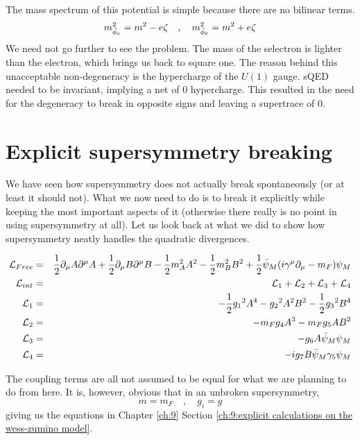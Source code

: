 The mass spectrum of this potential is simple because there are no bilinear terms.
\begin{equation}
    m^2_{\Tilde{\phi}_{e}} = m^2 - e\zeta \quad , \quad m^2_{\Tilde{\phi}_{\Bar{e}}} = m^2 + e\zeta
\end{equation}
We need not go further to see the problem. The mass of the selectron is lighter than the electron, which brings us back to square one. The reason behind this unacceptable non-degeneracy is the hypercharge of the $U(1)$ gauge. sQED needed to be invariant, implying a net of 0 hypercharge. This resulted in the need for the degeneracy to break in opposite signs and leaving a supertrace of 0.

\section{Explicit supersymmetry breaking}
\label{ch:14:explicity susy breaking}
We have seen how supersymmetry does not actually break spontaneously (or at least it should not). What we now need to do is to break it explicitly while keeping the most important aspects of it (otherwise there really is no point in using supersymmetry at all). Let us look back at what we did to show how supersymmetry neatly handles the quadratic divergences.

\begin{eqnarray}
    \mathcal{L}_{Free} &=& \frac{1}{2}\partial_\mu A \partial^\mu A + \frac{1}{2} \partial_\mu B \partial^\mu B - \frac{1}{2} m_A^2 A^2 - \frac{1}{2} m_B^2 B^2 + \frac{1}{2} \Bar{\psi}_M (i\gamma^\mu \partial_\mu - m_F) \psi_M \nonumber \\
    \mathcal{L}_{int} &=& \mathcal{L}_1 + \mathcal{L}_2 + \mathcal{L}_3 + \mathcal{L}_4 \nonumber \\
    \mathcal{L}_1 &=& - \frac{1}{2} {g_1}^2 A^4 - {g_2}^2 A^2 B^2 - \frac{1}{2} {g_3}^2 B^4 \nonumber \\
    \mathcal{L}_2 &=& -m_F g_4 A^3 - m_F g_5 AB^2 \nonumber \\
    \mathcal{L}_3 &=& -g_6 A \Bar{\psi}_M \psi_M \nonumber \\
    \mathcal{L}_4 &=& -i g_7 B \Bar{\psi}_M \gamma_5 \psi_M \nonumber \\
\end{eqnarray}

The coupling terms are all not assumed to be equal for what we are planning to do from here. It is, however, obvious that in an unbroken supersymmetry,
\begin{equation}
    m = m_F \quad , \quad g_i = g
\end{equation}
giving us the equations in Chapter \ref{ch:9} Section \ref{ch:9:explicit calculations on the wess-zumino model}.

